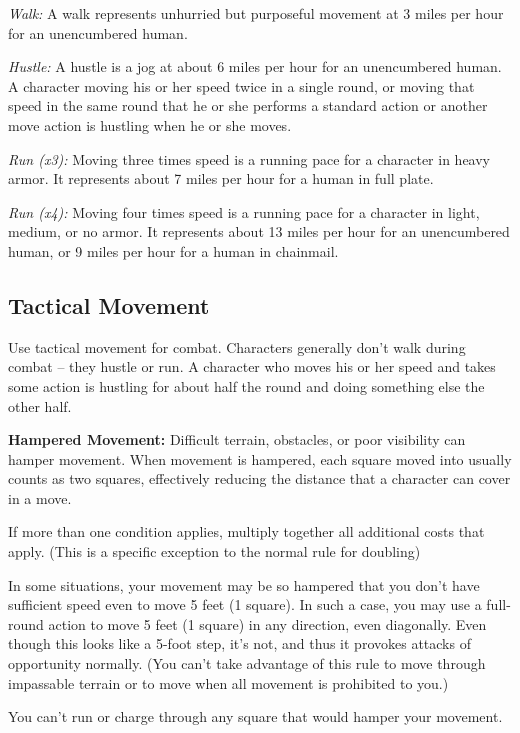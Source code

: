 \textit{Walk:} A walk represents unhurried but purposeful movement at 3 miles per hour for an unencumbered human.

\textit{Hustle:} A hustle is a jog at about 6 miles per hour for an unencumbered human. A character moving his or her speed twice in a single round, or moving that speed in the same round that he or she performs a standard action or another move action is hustling when he or she moves.

\textit{Run (x3):} Moving three times speed is a running pace for a character in heavy armor. It represents about 7 miles per hour for a human in full plate.

\textit{Run (x4):} Moving four times speed is a running pace for a character in light, medium, or no armor. It represents about 13 miles per hour for an unencumbered human, or 9 miles per hour for a human in chainmail.

\subsection{Tactical Movement}

Use tactical movement for combat. Characters generally don't walk during combat -- they hustle or run. A character who moves his or her speed and takes some action is hustling for about half the round and doing something else the other half.

\textbf{Hampered Movement:} Difficult terrain, obstacles, or poor visibility can hamper movement. When movement is hampered, each square moved into usually counts as two squares, effectively reducing the distance that a character can cover in a move. 

If more than one condition applies, multiply together all additional costs that apply. (This is a specific exception to the normal rule for doubling) 

In some situations, your movement may be so hampered that you don't have sufficient speed even to move 5 feet (1 square). In such a case, you may use a full-round action to move 5 feet (1 square) in any direction, even diagonally. Even though this looks like a 5-foot step, it's not, and thus it provokes attacks of opportunity normally. (You can't take advantage of this rule to move through impassable terrain or to move when all movement is prohibited to you.)

You can't run or charge through any square that would hamper your movement.

